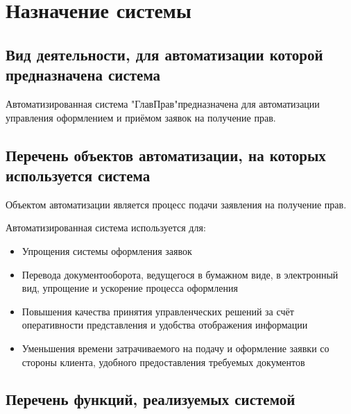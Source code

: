 \documentclass[russian, utf8, 12pt,pointsubsection,floatsubsection]{eskdtext}
\begin{document}
	\maketitle 

	\scriptsize
	\setcounter{tocdepth}{4}
	\tableofcontents
	\normalsize
	\newpage
	
\section{Назначение системы}



\subsection{Вид деятельности, для автоматизации которой предназначена система}
Автоматизированная система "ГлавПрав"предназначена для автоматизации управления оформлением и приёмом заявок на получение прав.
\subsection{Перечень объектов автоматизации, на которых используется система}

Объектом автоматизации является процесс подачи заявления на получение прав.

Автоматизированная система используется для:
\begin{itemize}
    \item Упрощения системы оформления заявок
    \item Перевода документооборота, ведущегося в бумажном виде, в электронный вид, упрощение и ускорение процесса оформления
    \item Повышения качества принятия управленческих решений за счёт оперативности представления и удобства отображения информации
    \item Уменьшения времени затрачиваемого на подачу и оформление заявки со стороны клиента, удобного предоставления требуемых документов
\end{itemize}

\subsection{Перечень функций, реализуемых системой}
\end{document}
